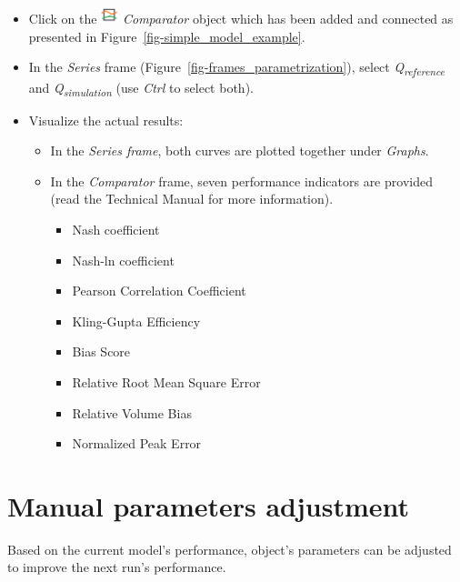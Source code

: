 \documentclass[
  letterpaper,
  DIV=11,
  numbers=noendperiod]{scrreprt}
\begin{document}
\begin{itemize}
\item
  {Click on the
  \includegraphics[width=0.2in,height=0.2in]{./figures/fig-icon_object_comparator.png}
  \emph{Comparator} object which has been added and connected as
  presented in Figure~\ref{fig-simple_model_example}.}
\item
  {In the \emph{Series} frame (Figure~\ref{fig-frames_parametrization}),
  select \emph{Q\textsubscript{reference}} and
  \emph{Q\textsubscript{simulation}} (use \emph{Ctrl} to select both).}
\item
  {Visualize the actual results:}

  \begin{itemize}
  \item
    {In the \emph{Series frame}, both curves are plotted together under
    \emph{Graphs}.}
  \item
    {In the \emph{Comparator} frame, seven performance indicators are
    provided (read the Technical Manual for more information).}

    \begin{itemize}
    \item
      {Nash coefficient}
    \item
      {Nash-ln coefficient}
    \item
      {Pearson Correlation Coefficient}
    \item
      {Kling-Gupta Efficiency}
    \item
      {Bias Score}
    \item
      {Relative Root Mean Square Error}
    \item
      {Relative Volume Bias}
    \item
      {Normalized Peak Error}
    \end{itemize}
  \end{itemize}
\end{itemize}

\hypertarget{sec-user_rainfall_runoff_param_adjustment}{%
\section{Manual parameters
adjustment}\label{sec-user_rainfall_runoff_param_adjustment}}

Based on the current model's performance, object's parameters can be
adjusted to improve the next run's performance.
\end{document}
